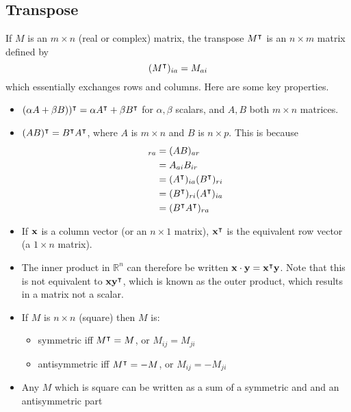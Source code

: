 \subsection{Transpose}
If \(M\) is an \(m \times n\) (real or complex) matrix, the transpose \(M^\intercal\) is an \(n \times m\) matrix defined by
\[
	(M^\intercal)_{ia} = M_{ai}
\]
which essentially exchanges rows and columns.
Here are some key properties.
\begin{itemize}
	\item \((\alpha A + \beta B))^\intercal = \alpha A^\intercal + \beta B^\intercal\) for \(\alpha, \beta\) scalars, and \(A, B\) both \(m \times n\) matrices.
	\item \((AB)^\intercal = B^\intercal A^\intercal\), where \(A\) is \(m \times n\) and \(B\) is \(n \times p\).
	      This is because
	      \begin{align*}
		      [(AB)^\transpose]_{ra} & = (AB)_{ar}                               \\
		                             & = A_{ai} B_{ir}                           \\
		                             & = (A^\transpose)_{ia} (B^\transpose)_{ri} \\
		                             & = (B^\transpose)_{ri} (A^\transpose)_{ia} \\
		                             & = (B^\transpose A^\transpose)_{ra}
	      \end{align*}
	\item If \(\vb x\) is a column vector (or an \(n \times 1\) matrix), \(\vb x^\intercal\) is the equivalent row vector (a \(1 \times n\) matrix).
	\item The inner product in \(\mathbb R^n\) can therefore be written \(\vb x \cdot \vb y = \vb x^\intercal \vb y\).
	      Note that this is not equivalent to \(\vb x \vb y^\intercal\), which is known as the outer product, which results in a matrix not a scalar.
	\item If \(M\) is \(n \times n\) (square) then \(M\) is:
	      \begin{itemize}
		      \item symmetric iff \(M^\intercal = M\), or \(M_{ij} = M_{ji}\)
		      \item antisymmetric iff \(M^\intercal = -M\), or \(M_{ij} = -M_{ji}\)
	      \end{itemize}
	\item Any \(M\) which is square can be written as a sum of a symmetric and and an antisymmetric part

\end{itemize}
